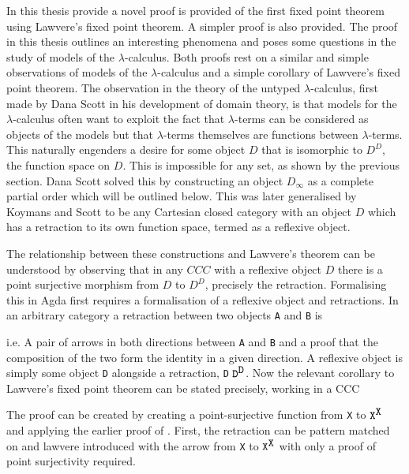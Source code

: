 In this thesis provide a novel proof is provided of the first fixed point
theorem using Lawvere's fixed point theorem. A simpler proof is also provided.
The proof in this thesis outlines an interesting phenomena and poses some
questions in the study of models of the $\lambda$-calculus. Both proofs rest on
a similar and simple observations of models of the $\lambda$-calculus and a
simple corollary of Lawvere's fixed point theorem. The observation in the
theory of the untyped $\lambda$-calculus, first made by Dana Scott in his
development of domain theory, is that models for the $\lambda$-calculus often
want to exploit the fact that $\lambda$-terms can be considered as objects of
the models but that $\lambda$-terms themselves are functions between
$\lambda$-terms. This naturally engenders a desire for some object $D$ that is
isomorphic to $D^D$, the function space on $D$. This is impossible for any set,
as shown by the previous section. Dana Scott solved this by constructing an
object $D_{\infty}$ as a complete partial order which will be outlined below.
This was later generalised by Koymans and Scott to be any Cartesian closed
category with an object $D$ which has a retraction to its own function space,
termed as a reflexive object.

The relationship between these constructions and Lawvere's theorem can be
understood by observing that in any $CCC$ with a reflexive object $D$ there is a
point surjective morphism from $D$ to $D^D$, precisely the retraction.
Formalising this in Agda first requires a formalisation of a reflexive object
and retractions. In an arbitrary category a retraction between two objects
\verb|A| and \verb|B| is


i.e. A pair of arrows in both directions between \verb|A| and \verb|B| and a
proof that the composition of the two form the identity in a given direction.
A reflexive object is simply some object \verb|D| alongside a retraction,
 \verb|D| $\verb|D|^{\verb|D|}$. Now the relevant
corollary to Lawvere's fixed point theorem can be stated precisely, working in a
CCC


The proof can be created by creating a point-surjective function from \verb|X|
to $\verb|X|^{\verb|X|}$ and applying the earlier proof of
. First, the retraction can be pattern matched on and
lawvere introduced with the arrow from \verb|X| to $\verb|X|^{\verb|X|}$ with
only a proof of point surjectivity required.

